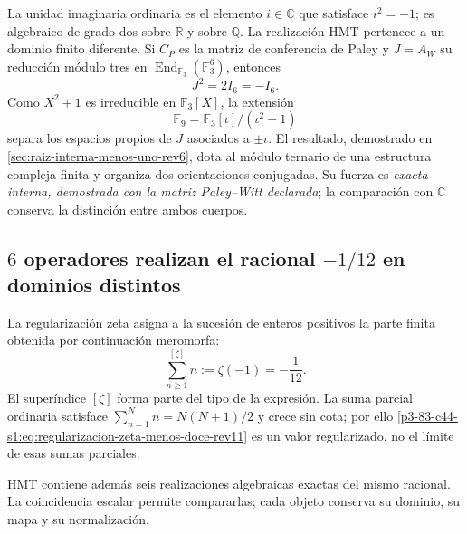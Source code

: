 La unidad imaginaria ordinaria es el elemento
\(i\in\mathbb C\) que satisface \(i^2=-1\); es algebraico de grado dos sobre
\(\mathbb R\) y sobre \(\mathbb Q\). La realizaci\'on HMT pertenece a un
dominio finito diferente. Si \(C_P\) es la matriz de conferencia de Paley y
\(J=A_W\) su reducci\'on m\'odulo tres en
\(\operatorname{End}_{\mathbb F_3}(\mathbb F_3^6)\), entonces
\begin{equation}
 \boxed{J^2=2I_6=-I_6.}
 \label{p3-83-c44-s1:eq:raiz-interna-menos-uno-ontologia-rev11}
\end{equation}
Como \(X^2+1\) es irreducible en \(\mathbb F_3[X]\), la extensi\'on
\[
 \mathbb F_9=\mathbb F_3[\iota]/(\iota^2+1)
\]
separa los espacios propios de \(J\) asociados a \(\pm\iota\). El resultado,
demostrado en \cref{sec:raiz-interna-menos-uno-rev6}, dota al m\'odulo ternario de una
estructura compleja finita y organiza dos orientaciones conjugadas. Su fuerza
es \emph{exacta interna, demostrada con la matriz Paley--Witt declarada}; la
comparaci\'on con \(\mathbb C\) conserva la distinci\'on entre ambos cuerpos.

\subsection{\(6\) operadores realizan el racional
\texorpdfstring{\( -1/12 \)}{-1/12} en dominios distintos}

La regularizaci\'on zeta asigna a la sucesi\'on de enteros positivos la parte
finita obtenida por continuaci\'on meromorfa:
\begin{equation}
 \sum_{n\geq1}^{[\zeta]}n
 :=\zeta(-1)=-\frac1{12}.
 \label{p3-83-c44-s1:eq:regularizacion-zeta-menos-doce-rev11}
\end{equation}
El super\'indice \([\zeta]\) forma parte del tipo de la expresi\'on. La suma
parcial ordinaria satisface
\(\sum_{n=1}^{N}n=N(N+1)/2\) y crece sin cota; por ello
\eqref{p3-83-c44-s1:eq:regularizacion-zeta-menos-doce-rev11} es un valor regularizado, no
el l\'imite de esas sumas parciales.

HMT contiene adem\'as seis realizaciones algebraicas exactas del mismo
racional. La coincidencia escalar permite compararlas; cada objeto conserva su
dominio, su mapa y su normalizaci\'on.

